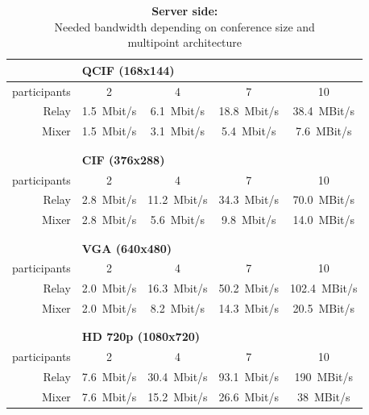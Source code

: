 \begin{table}[htbp]
\centering
\caption[Bandwidth requirements on server side of conversation]{\textbf{Server side:} \\Needed bandwidth depending on conference size and \\multipoint architecture}
\begin{tabular}{r c c c c}

    \toprule
    & \multicolumn{4}{l}{\textbf{QCIF (168x144)} }\\
    \toprule
    participants & 2 & 4 & 7 & 10\\
    \midrule
    Relay & 1.5~Mbit/s & 6.1~Mbit/s & 18.8~Mbit/s  & 38.4~MBit/s\\
    Mixer & 1.5~Mbit/s & 3.1~Mbit/s & 5.4~Mbit/s  & 7.6~MBit/s\\
    \bottomrule

    &&&&\\ &&&&\\

    \toprule
    & \multicolumn{4}{l}{\textbf{CIF (376x288)} }\\
    \toprule
    participants & 2 & 4 & 7 & 10\\
    \midrule
    Relay & 2.8~Mbit/s & 11.2~Mbit/s & 34.3~Mbit/s  & 70.0~MBit/s\\
    Mixer & 2.8~Mbit/s & 5.6~Mbit/s & 9.8~Mbit/s  & 14.0~MBit/s\\
    \bottomrule

    &&&&\\ &&&&\\

    \toprule
    & \multicolumn{4}{l}{\textbf{VGA (640x480)} }\\
    \toprule
    participants & 2 & 4 & 7 & 10\\
    \midrule
    Relay & 2.0~Mbit/s & 16.3~Mbit/s & 50.2~Mbit/s  & 102.4~MBit/s\\
    Mixer & 2.0~Mbit/s & 8.2~Mbit/s & 14.3~Mbit/s  & 20.5~MBit/s\\
    \bottomrule

    &&&&\\ &&&&\\
        
    \toprule
    & \multicolumn{4}{l}{\textbf{HD 720p (1080x720)} }\\
    \toprule
    participants & 2 & 4 & 7 & 10\\
    \midrule
    Relay & 7.6~Mbit/s & 30.4~Mbit/s & 93.1~Mbit/s  & 190~MBit/s\\
    Mixer & 7.6~Mbit/s & 15.2~Mbit/s & 26.6~Mbit/s  & 38~MBit/s\\
    \bottomrule
    
\end{tabular}%
\label{tab:benchmark-server}%
\end{table}%
